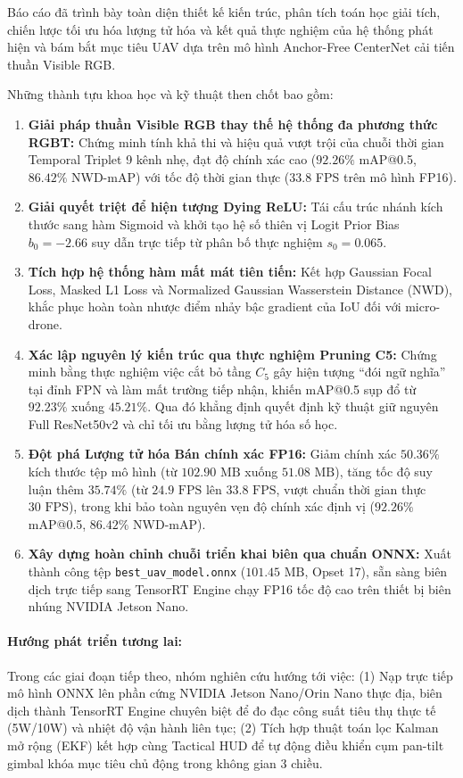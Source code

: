 \documentclass[11pt,a4paper]{article}
\begin{document}
Báo cáo đã trình bày toàn diện thiết kế kiến trúc, phân tích toán học giải tích, chiến lược tối ưu hóa lượng tử hóa và kết quả thực nghiệm của hệ thống phát hiện và bám bắt mục tiêu UAV dựa trên mô hình Anchor-Free CenterNet cải tiến thuần Visible RGB.

Những thành tựu khoa học và kỹ thuật then chốt bao gồm:
\begin{enumerate}
    \item \textbf{Giải pháp thuần Visible RGB thay thế hệ thống đa phương thức RGBT:} Chứng minh tính khả thi và hiệu quả vượt trội của chuỗi thời gian Temporal Triplet 9 kênh nhẹ, đạt độ chính xác cao ($92.26\%$ mAP@0.5, $86.42\%$ NWD-mAP) với tốc độ thời gian thực ($33.8$ FPS trên mô hình FP16).
    \item \textbf{Giải quyết triệt để hiện tượng Dying ReLU:} Tái cấu trúc nhánh kích thước sang hàm Sigmoid và khởi tạo hệ số thiên vị Logit Prior Bias $b_0 = -2.66$ suy dẫn trực tiếp từ phân bố thực nghiệm $s_0 = 0.065$.
    \item \textbf{Tích hợp hệ thống hàm mất mát tiên tiến:} Kết hợp Gaussian Focal Loss, Masked L1 Loss và Normalized Gaussian Wasserstein Distance (NWD), khắc phục hoàn toàn nhược điểm nhảy bậc gradient của IoU đối với micro-drone.
    \item \textbf{Xác lập nguyên lý kiến trúc qua thực nghiệm Pruning C5:} Chứng minh bằng thực nghiệm việc cắt bỏ tầng $C_5$ gây hiện tượng ``đói ngữ nghĩa'' tại đỉnh FPN và làm mất trường tiếp nhận, khiến mAP@0.5 sụp đổ từ $92.23\%$ xuống $45.21\%$. Qua đó khẳng định quyết định kỹ thuật giữ nguyên Full ResNet50v2 và chỉ tối ưu bằng lượng tử hóa số học.
    \item \textbf{Đột phá Lượng tử hóa Bán chính xác FP16:} Giảm chính xác $50.36\%$ kích thước tệp mô hình (từ $102.90\text{ MB}$ xuống $51.08\text{ MB}$), tăng tốc độ suy luận thêm $35.74\%$ (từ $24.9\text{ FPS}$ lên $33.8\text{ FPS}$, vượt chuẩn thời gian thực $30\text{ FPS}$), trong khi bảo toàn nguyên vẹn độ chính xác định vị ($92.26\%$ mAP@0.5, $86.42\%$ NWD-mAP).
    \item \textbf{Xây dựng hoàn chỉnh chuỗi triển khai biên qua chuẩn ONNX:} Xuất thành công tệp {\texttt{best\_uav\_model.onnx}} ($101.45\text{ MB}$, Opset 17), sẵn sàng biên dịch trực tiếp sang TensorRT Engine chạy FP16 tốc độ cao trên thiết bị biên nhúng NVIDIA Jetson Nano.
\end{enumerate}

\paragraph{Hướng phát triển tương lai:}
Trong các giai đoạn tiếp theo, nhóm nghiên cứu hướng tới việc: (1) Nạp trực tiếp mô hình ONNX lên phần cứng NVIDIA Jetson Nano/Orin Nano thực địa, biên dịch thành TensorRT Engine chuyên biệt để đo đạc công suất tiêu thụ thực tế (5W/10W) và nhiệt độ vận hành liên tục; (2) Tích hợp thuật toán lọc Kalman mở rộng (EKF) kết hợp cùng Tactical HUD để tự động điều khiển cụm pan-tilt gimbal khóa mục tiêu chủ động trong không gian 3 chiều.
\end{document}
